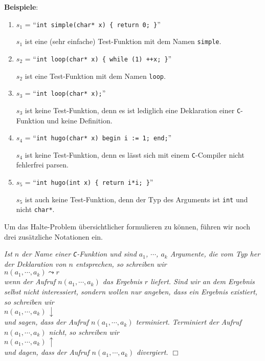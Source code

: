 \noindent
\textbf{Beispiele}:  
\begin{enumerate}
\item $s_1$ = ``{\tt int simple(char* x) \{ return 0; \}}''

      $s_1$ ist eine (sehr einfache) Test-Funktion mit dem Namen \texttt{simple}.
\item $s_2$ = ``{\tt int loop(char* x) \{ while (1) ++x; \}}''

      $s_2$ ist eine Test-Funktion mit dem Namen \texttt{loop}. 
\item $s_3$ = ``{\tt int loop(char* x);}''

      $s_3$ ist keine Test-Funktion, denn es ist lediglich eine Deklaration einer
      \texttt{C}-Funktion und keine Definition.
\item $s_4$ = ``{\tt int hugo(char* x) begin i := 1; end;}''

      $s_4$ ist keine Test-Funktion, denn es l\"asst sich mit einem
      \texttt{C}-Compiler nicht fehlerfrei parsen.
\item $s_5$ = ``{\tt int hugo(int x) \{ return i*i; \}}''

      $s_5$ ist auch keine Test-Funktion, denn der Typ des Arguments ist \texttt{int}
      und nicht \texttt{char*}.
\end{enumerate}
Um das Halte-Problem \"ubersichtlicher formulieren zu k\"onnen, f\"uhren wir noch drei
zus\"atzliche Notationen ein.
\begin{Definition}[$\leadsto$, $\downarrow$, $\uparrow$]
{\em
Ist $n$ der Name einer \texttt{C}-Funktion und sind $a_1$, $\cdots$, $a_k$ Argumente, die
vom Typ her der Deklaration von $n$ entsprechen, so schreiben wir \\[0.3cm]
\hspace*{1.3cm} $n(a_1, \cdots, a_k) \leadsto r$ \\[0.3cm]
wenn der Aufruf $n(a_1, \cdots, a_k)$ das Ergebnis $r$ liefert.  Sind wir an dem Ergebnis
selbst nicht interessiert, sondern wollen nur angeben, dass ein Ergebnis existiert, so
schreiben wir \\[0.3cm]
\hspace*{1.3cm} $n(a_1, \cdots, a_k) \,\downarrow$ \\[0.3cm]
und sagen, dass der Aufruf $n(a_1, \cdots, a_k)$ \emph{terminiert}.
Terminiert der Aufruf $n(a_1, \cdots, a_k)$ nicht, so schreiben wir \\[0.3cm]
\hspace*{1.3cm} $n(a_1, \cdots, a_k) \,\uparrow$ \\[0.3cm]
und dagen, dass der Aufruf $n(a_1, \cdots, a_k)$ \emph{divergiert}.
\hspace*{\fill} $\Box$
}
\end{Definition}

